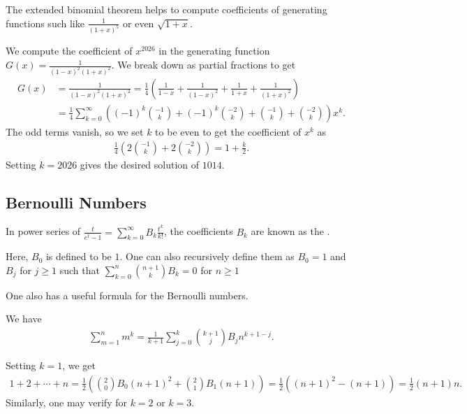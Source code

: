 The extended binomial theorem helps to compute coefficients of generating functions such like $\frac{1}{(1+x)^{5}}$ or even $\sqrt{1+x}$.

\begin{example}
    We compute the coefficient of $x^{2026}$ in the generating function $G(x) = \frac{1}{(1-x)^{2}(1+x)^{2}}$. We break down as partial fractions to get
    \begin{align}
        G(x) &= \frac{1}{(1-x)^{2}(1+x)^{2}} = \frac{1}{4} \left( \frac{1}{1-x} + \frac{1}{(1-x)^{2}} + \frac{1}{1+x} + \frac{1}{(1+x)^{2}} \right) \\ &= \frac{1}{4} \sum_{k=0}^{\infty} \left((-1)^{k} \binom{-1}{k}+(-1)^{k} \binom{-2}{k} + \binom{-1}{k} + \binom{-2}{k}\right) x^{k}.
    \end{align}
    The odd terms vanish, so we set $k$ to be even to get the coefficient of $x^{k}$ as
    \begin{align}
        \frac{1}{4} \left( 2\binom{-1}{k}+2\binom{-2}{k}\right) = 1 + \frac{k}{2}.
    \end{align}
    Setting $k = 2026$ gives the desired solution of $1014$.
\end{example}

\subsection{Bernoulli Numbers}

\begin{definition}
    In power series of $\frac{t}{e^{t}-1} = \sum_{k=0}^{\infty} B_{k} \frac{t^{k}}{k!}$, the coefficients $B_{k}$ are known as the .
\end{definition}

Here, $B_{0}$ is defined to be $1$. One can also recursively define them as $B_{0} = 1$ and $B_{j}$ for $j \geq 1$ such that $\sum_{k=0}^{n} \binom{n+1}{k} B_{k} = 0$ for $n \geq 1$

One also has a useful formula for the Bernoulli numbers.

\begin{theorem}
    We have
    \begin{align}
        \sum_{m=1}^{n} m^{k} = \frac{1}{k+1} \sum_{j=0}^{k} \binom{k+1}{j} B_{j} n^{k+1-j}.
    \end{align}
\end{theorem}

Setting $k = 1$, we get
\begin{align}
    1 +2 + \cdots + n = \frac{1}{2} \left(\binom{2}{0}B_{0}(n+1)^{2} + \binom{2}{1}B_{1}(n+1) \right) = \frac{1}{2} \left( (n+1)^{2} - (n+1) \right) = \frac{1}{2}(n+1)n.
\end{align}
Similarly, one may verify for $k = 2$ or $k = 3$.

